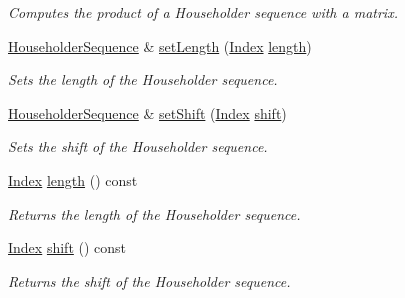 \begin{DoxyCompactItemize}
\begin{DoxyCompactList}\small\item\em Computes the product of a Householder sequence with a matrix. \end{DoxyCompactList}\item 
\mbox{\hyperlink{class_eigen_1_1_householder_sequence}{Householder\+Sequence}} \& \mbox{\hyperlink{class_eigen_1_1_householder_sequence_a30cc06d5b2ca4b7dcf5fcd53313d25fc}{set\+Length}} (\mbox{\hyperlink{struct_eigen_1_1_eigen_base_a554f30542cc2316add4b1ea0a492ff02}{Index}} \mbox{\hyperlink{class_eigen_1_1_householder_sequence_ac62fad812f3893f237378fe70e55bf66}{length}})
\begin{DoxyCompactList}\small\item\em Sets the length of the Householder sequence. \end{DoxyCompactList}\item 
\mbox{\hyperlink{class_eigen_1_1_householder_sequence}{Householder\+Sequence}} \& \mbox{\hyperlink{class_eigen_1_1_householder_sequence_a2d8d996ce1085fd977850988735739f0}{set\+Shift}} (\mbox{\hyperlink{struct_eigen_1_1_eigen_base_a554f30542cc2316add4b1ea0a492ff02}{Index}} \mbox{\hyperlink{class_eigen_1_1_householder_sequence_a34482bfad5563fd8a8a4264db76ac917}{shift}})
\begin{DoxyCompactList}\small\item\em Sets the shift of the Householder sequence. \end{DoxyCompactList}\item 
\mbox{\label{class_eigen_1_1_householder_sequence_ac62fad812f3893f237378fe70e55bf66}} 
\mbox{\hyperlink{struct_eigen_1_1_eigen_base_a554f30542cc2316add4b1ea0a492ff02}{Index}} \mbox{\hyperlink{class_eigen_1_1_householder_sequence_ac62fad812f3893f237378fe70e55bf66}{length}} () const
\begin{DoxyCompactList}\small\item\em Returns the length of the Householder sequence. \end{DoxyCompactList}\item 
\mbox{\label{class_eigen_1_1_householder_sequence_a34482bfad5563fd8a8a4264db76ac917}} 
\mbox{\hyperlink{struct_eigen_1_1_eigen_base_a554f30542cc2316add4b1ea0a492ff02}{Index}} \mbox{\hyperlink{class_eigen_1_1_householder_sequence_a34482bfad5563fd8a8a4264db76ac917}{shift}} () const
\begin{DoxyCompactList}\small\item\em Returns the shift of the Householder sequence. \end{DoxyCompactList}\end{DoxyCompactItemize}
